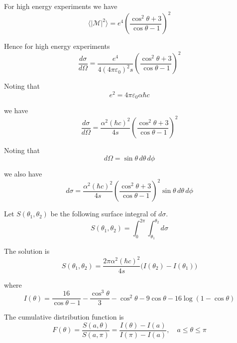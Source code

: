 For high energy experiments we have
\begin{equation*}
\langle|\mathcal{M}|^2\rangle=e^4\left(\frac{\cos^2\theta+3}{\cos\theta-1}\right)^2
\end{equation*}

Hence for high energy experiments
\begin{equation*}
\frac{d\sigma}{d\Omega}=\frac{e^4}{4(4\pi\varepsilon_0)^2s}
\left(\frac{\cos^2\theta+3}{\cos\theta-1}\right)^2
\end{equation*}

Noting that
\begin{equation*}
e^2=4\pi\varepsilon_0\alpha\hbar c
\end{equation*}

we have
\begin{equation*}
\frac{d\sigma}{d\Omega}
=\frac{\alpha^2(\hbar c)^2}{4s}
\left(\frac{\cos^2\theta+3}{\cos\theta-1}\right)^2
\end{equation*}

Noting that
\begin{equation*}
d\Omega=\sin\theta\,d\theta\,d\phi
\end{equation*}

we also have
\begin{equation*}
d\sigma=\frac{\alpha^2(\hbar c)^2}{4s}
\left(\frac{\cos^2\theta+3}{\cos\theta-1}\right)^2
\sin\theta\,d\theta\,d\phi
\end{equation*}

Let $S(\theta_1,\theta_2)$ be the following surface integral of $d\sigma$.
\begin{equation*}
S(\theta_1,\theta_2)=\int_0^{2\pi}\int_{\theta_1}^{\theta_2}d\sigma
\end{equation*}


The solution is
\begin{equation*}
S(\theta_1,\theta_2)=\frac{2\pi\alpha^2(\hbar c)^2}{4s}\bigl(I(\theta_2)-I(\theta_1)\bigr)
\end{equation*}

where
\begin{equation*}
I(\theta)=\frac{16}{\cos\theta-1}-\frac{\cos^3\theta}{3}-\cos^2\theta-9\cos\theta-16\log(1-\cos\theta)
\end{equation*}

The cumulative distribution function is
\begin{equation*}
F(\theta)
=\frac{S(a,\theta)}{S(a,\pi)}
=\frac{I(\theta)-I(a)}{I(\pi)-I(a)},
\quad
a\le\theta\le\pi
\end{equation*}

